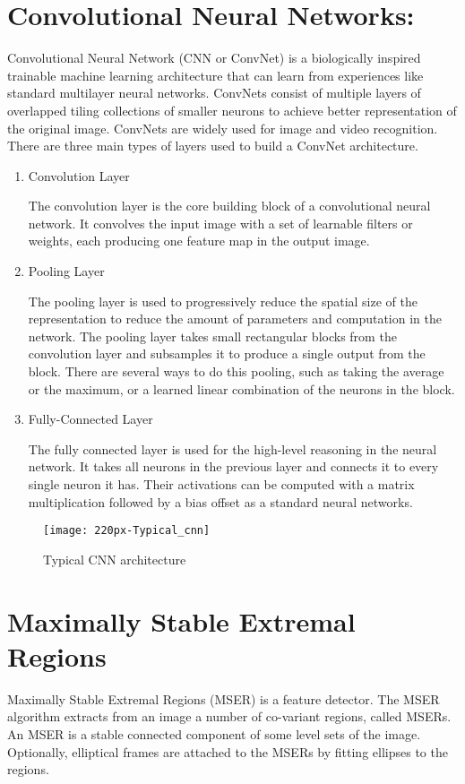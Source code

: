     \section{Convolutional Neural Networks:}
Convolutional Neural Network (CNN or ConvNet) is a biologically inspired trainable machine learning architecture that can learn from experiences like standard multilayer neural networks. ConvNets consist of multiple layers of overlapped tiling collections of smaller neurons to achieve better representation of the original image. ConvNets are widely used for image and video recognition. There are three main types of layers used to build a ConvNet architecture.

        \begin{enumerate}
        \item Convolution Layer
        
The convolution layer is the core building block of a convolutional neural network. It convolves the input image with a set of learnable filters or weights, each producing one feature map in the output image.

        \item Pooling Layer
        
The pooling layer is used to progressively reduce the spatial size of the representation to reduce the amount of parameters and computation in the network. The pooling layer takes small rectangular blocks from the convolution layer and subsamples it to produce a single output from the block. There are several ways to do this pooling, such as taking the average or the maximum, or a learned linear combination of the neurons in the block.

        \item Fully-Connected Layer
        
The fully connected layer is used for the high-level reasoning in the neural network. It takes all neurons in the previous layer and connects it to every single neuron it has. Their activations can be computed with a matrix multiplication followed by a bias offset as a standard neural networks.

\end{enumerate}

\begin{figure}[htb]
\centering
\texttt{[image: 220px-Typical\_cnn]}
\caption{Typical CNN architecture}
\end{figure}

    \section{ Maximally Stable Extremal Regions}
Maximally Stable Extremal Regions (MSER) is a feature detector. The MSER algorithm extracts from an image a number of co-variant regions, called MSERs. An MSER is a stable connected component of some level sets of the image. Optionally, elliptical frames are attached to the MSERs by fitting ellipses to the regions.
